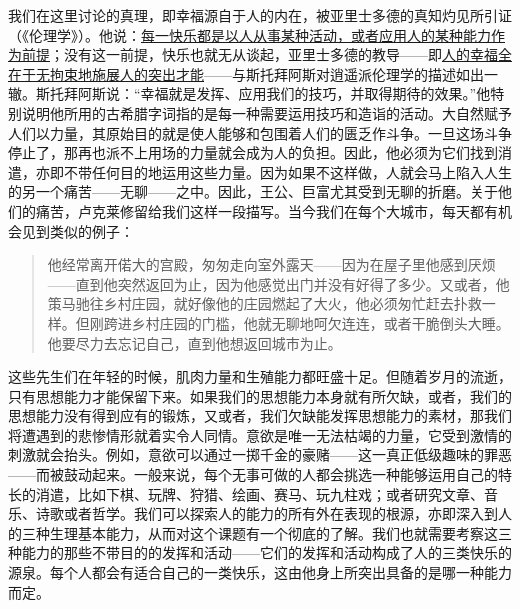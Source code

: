 \documentclass[12pt,oneside]{book}
\begin{document}
我们在这里讨论的真理，即幸福源自于人的内在，被亚里士多德的真知灼见所引证（《伦理学》）。他说：\uline{每一快乐都是以人从事某种活动，或者应用人的某种能力作为前提}；没有这一前提，快乐也就无从谈起，亚里士多德的教导——即\uline{人的幸福全在于无拘束地施展人的突出才能}——与斯托拜阿斯对逍遥派伦理学的描述如出一辙。斯托拜阿斯说：“幸福就是发挥、应用我们的技巧，并取得期待的效果。”他特别说明他所用的古希腊字词指的是每一种需要运用技巧和造诣的活动。大自然赋予人们以力量，其原始目的就是使人能够和包围着人们的匮乏作斗争。一旦这场斗争停止了，那再也派不上用场的力量就会成为人的负担。因此，他必须为它们找到消遣，亦即不带任何目的地运用这些力量。因为如果不这样做，人就会马上陷入人生的另一个痛苦——无聊——之中。因此，王公、巨富尤其受到无聊的折磨。关于他们的痛苦，卢克莱修留给我们这样一段描写。当今我们在每个大城市，每天都有机会见到类似的例子： 

 
\begin{quotation}
他经常离开偌大的宫殿，匆匆走向室外露天——因为在屋子里他感到厌烦——直到他突然返回为止，因为他感觉出门并没有好得了多少。又或者，他策马驰往乡村庄园，就好像他的庄园燃起了大火，他必须匆忙赶去扑救一样。但刚跨进乡村庄园的门槛，他就无聊地呵欠连连，或者干脆倒头大睡。他要尽力去忘记自己，直到他想返回城市为止。 
\end{quotation}
 

这些先生们在年轻的时候，肌肉力量和生殖能力都旺盛十足。但随着岁月的流逝，只有思想能力才能保留下来。如果我们的思想能力本身就有所欠缺，或者，我们的思想能力没有得到应有的锻炼，又或者，我们欠缺能发挥思想能力的素材，那我们将遭遇到的悲惨情形就着实令人同情。意欲是唯一无法枯竭的力量，它受到激情的刺激就会抬头。例如，意欲可以通过一掷千金的豪赌——这一真正低级趣味的罪恶——而被鼓动起来。一般来说，每个无事可做的人都会挑选一种能够运用自己的特长的消遣，比如下棋、玩牌、狩猎、绘画、赛马、玩九柱戏；或者研究文章、音乐、诗歌或者哲学。我们可以探索人的能力的所有外在表现的根源，亦即深入到人的三种生理基本能力，从而对这个课题有一个彻底的了解。我们也就需要考察这三种能力的那些不带目的的发挥和活动——它们的发挥和活动构成了人的三类快乐的源泉。每个人都会有适合自己的一类快乐，这由他身上所突出具备的是哪一种能力而定。
\end{document}
